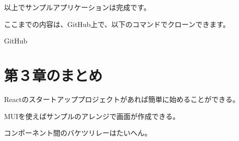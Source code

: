 以上でサンプルアプリケーションは完成です。

\begin{starternote}[]{}

ここまでの内容は、GitHub上で、以下のコマンドでクローンできます。

\def\startercodeblockfontsize{}
\begin{starterterminal}[]{GitHub}\end{starterterminal}
\end{starternote}

\section{第３章のまとめ}
\keeplastskip{
  \label{sec:3-5}
  \label{sec03-sammary}
  \par\nobreak
}

\begin{starteritemize}
\item Reactのスタートアッププロジェクトがあれば簡単に始めることができる。
\item MUIを使えばサンプルのアレンジで画面が作成できる。
\item コンポーネント間のバケツリレーはたいへん。
\end{starteritemize}
